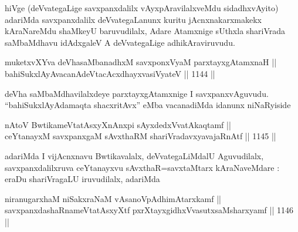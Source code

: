 \begin{artha}
hiVge (deVvategaLige savxpanxdalilx vAyxpAravilalxveMdu sidadhxvAyito) adariMda savxpanxdalilx deVvategaLanunx kuritu jAcnxnakarxmakekx kAraNareMdu shaMkeyU baruvudilalx, Adare Atamxnige sUthxla shariVrada saMbaMdhavu idAdxgaleV A deVvategaLige adhikAraviruvudu.
\end{artha}


\begin{shl}
muketxvXYva deVhasaMbanadhxM savxponxV\s yaM parxtayxgAtamxnaH || \\
bahiSukxlAyAvacanAdeVtacAcxdhayxvasiVyateV ||  1144 ||
\end{shl}

\begin{artha}
deVha saMbaMdhavilalxdeye parxtayxgAtamxnige I savxpanxvAguvudu. ``bahiSukxlAyAdamaqta shacxritAvx'' eMba vacanadiMda idanunx niNaRyiside
\end{artha}


\begin{shl}
nAtoV BwtikameVtatAsxyXnAnxpi sAyxdedxVvatAkaqtamf || \\
ceYtanayxM savxpanxgaM sAvxthaRM shariVradavxyavajaRnAtf ||  1145 ||  
\end{shl}

\begin{artha}
adariMda I vijAcnxnavu Bwtikavalalx, deVvategaLiMdalU Aguvudilalx, savxpanxdalilxruva ceYtanayxvu sAvxthaR=savxtaMtarx kAraNaveMdare : eraDu shariVragaLU iruvudilalx, adariMda
\end{artha}

\begin{shl}
\footnotemark[1]niranugarxhaM \footnotemark[2]niSakxraNaM \footnotemark[3]vAsanoVpAdhimAtarxkamf || \\
savxpanxdashaRnameVtatAsxyXtf \footnotemark[4]pxrXtayxgidhxVvasutxsaMsharxyamf ||  1146 ||  
\end{shl}


